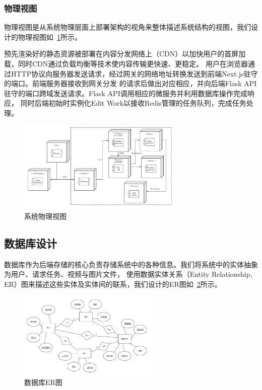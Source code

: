 \subsubsection{物理视图}

物理视图是从系统物理层面上部署架构的视角来整体描述系统结构的视图，我们设计的物理视图如~\ref{fig:system-deploy}所示。

预先渲染好的静态资源被部署在内容分发网络上（CDN）\cite{peng2004cdn}以加快用户的首屏加载，同时CDN通过负载均衡等技术使内容传输更快速、更稳定。
用户在浏览器通过HTTP协议向服务器发送请求，经过网关的网络地址转换发送到前端Next.js驻守的端口。前端服务器接收到网关分发
的请求后做出对应相应，并向后端Flask API驻守的端口跨域发送请求。Flask API调用相应的微服务并利用数据库操作完成响应，
同时后端初始时实例化Edit Work以接收Redis管理的任务队列，完成任务处理。

\begin{figure}[ht]
    \centering
    \includegraphics[width=0.7\textwidth]{source/img/system_deploy.png}
    \caption{系统物理视图}
    \label{fig:system-deploy}
\end{figure}

\subsection{数据库设计}

数据库作为后端存储的核心负责存储系统中的各种信息。我们将系统中的实体抽象为用户、请求任务、视频与图片文件，
使用数据实体关系（Entity Relationship, ER）\cite{chen1976entity}图来描述这些实体及实体间的联系，我们设计的ER图如~\ref{fig:database-ER}所示。

\begin{figure}[ht]
    \centering
    \includegraphics[width=0.6\textwidth]{source/img/database_ER.png}
    \caption{数据库ER图}
    \label{fig:database-ER}
\end{figure}

